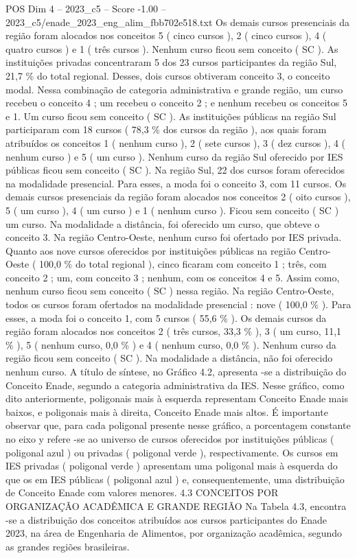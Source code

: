 \begin{textsample}{POS Dim 4 – 2023\_c5 – Score -1.00 – 2023\_c5/enade\_2023\_eng\_alim\_fbb702e518.txt}
Os demais cursos presenciais da região foram alocados nos conceitos 5 ( cinco cursos ), 2 ( cinco cursos ), 4 ( quatro cursos ) e 1 ( três cursos ).
Nenhum curso ficou sem conceito ( SC ).
As instituições privadas concentraram 5 dos 23 cursos participantes da região Sul, 21,7 \% do total regional.
Desses, dois cursos obtiveram conceito 3, o conceito modal.
Nessa combinação de categoria administrativa e grande região, um curso recebeu o conceito 4 ; um recebeu o conceito 2 ; e nenhum recebeu os conceitos 5 e 1.
Um curso ficou sem conceito ( SC ).
As instituições públicas na região Sul participaram com 18 cursos ( 78,3 \% dos cursos da região ), aos quais foram atribuídos os conceitos 1 ( nenhum curso ), 2 ( sete cursos ), 3 ( dez cursos ), 4 ( nenhum curso ) e 5 ( um curso ).
Nenhum curso da região Sul oferecido por IES públicas ficou sem conceito ( SC ).
Na região Sul, 22 dos cursos foram oferecidos na modalidade presencial.
Para esses, a moda foi o conceito 3, com 11 cursos.
Os demais cursos presenciais da região foram alocados nos conceitos 2 ( oito cursos ), 5 ( um curso ), 4 ( um curso ) e 1 ( nenhum curso ).
Ficou sem conceito ( SC ) um curso.
Na modalidade a distância, foi oferecido um curso, que obteve o conceito 3.
Na região Centro-Oeste, nenhum curso foi ofertado por IES privada.
Quanto aos nove cursos oferecidos por instituições públicas na região Centro-Oeste ( 100,0 \% do total regional ), cinco ficaram com conceito 1 ; três, com conceito 2 ; um, com conceito 3 ; nenhum, com os conceitos 4 e 5.
Assim como, nenhum curso ficou sem conceito ( SC ) nessa região.
Na região Centro-Oeste, todos os cursos foram ofertados na modalidade presencial : nove ( 100,0 \% ).
Para esses, a moda foi o conceito 1, com 5 cursos ( 55,6 \% ).
Os demais cursos da região foram alocados nos conceitos 2 ( três cursos, 33,3 \% ), 3 ( um curso, 11,1 \% ), 5 ( nenhum curso, 0,0 \% ) e 4 ( nenhum curso, 0,0 \% ).
Nenhum curso da região ficou sem conceito ( SC ).
Na modalidade a distância, não foi oferecido nenhum curso.
A título de síntese, no Gráfico 4.2, apresenta -se a distribuição do Conceito Enade, segundo a categoria administrativa da IES.
Nesse gráfico, como dito anteriormente, poligonais mais à esquerda representam Conceito Enade mais baixos, e poligonais mais à direita, Conceito Enade mais altos.
É importante observar que, para cada poligonal presente nesse gráfico, a porcentagem constante no eixo y refere -se ao universo de cursos oferecidos por instituições públicas ( poligonal azul ) ou privadas ( poligonal verde ), respectivamente.
Os cursos em IES privadas ( poligonal verde ) apresentam uma poligonal mais à esquerda do que os em IES públicas ( poligonal azul ) e, consequentemente, uma distribuição de Conceito Enade com valores menores. 4.3 CONCEITOS POR ORGANIZAÇÃO ACADÊMICA E GRANDE REGIÃO Na Tabela 4.3, encontra -se a distribuição dos conceitos atribuídos aos cursos participantes do Enade 2023, na área de Engenharia de Alimentos, por organização acadêmica, segundo as grandes regiões brasileiras.

\end{textsample}
